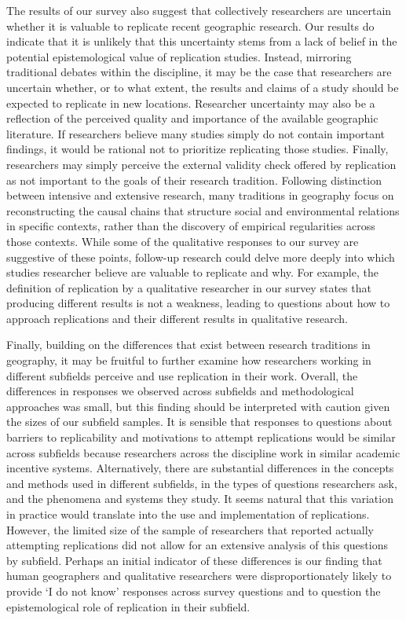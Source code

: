 \documentclass[]{interact}
\theoremstyle{plain}%
\theoremstyle{definition}
\theoremstyle{remark}
\begin{document}
The results of our survey also suggest that collectively researchers are uncertain whether it is valuable to replicate recent geographic research. 
Our results do indicate that it is unlikely that this uncertainty stems from a lack of belief in the potential epistemological value of replication studies.
Instead, mirroring traditional debates within the discipline, it may be the case that researchers are uncertain whether, or to what extent, the results and claims of a study should be expected to replicate in new locations. 
Researcher uncertainty may also be a reflection of the perceived quality and importance of the available geographic literature. 
If researchers believe many studies simply do not contain important findings, it would be rational not to prioritize replicating those studies.
Finally, researchers may simply perceive the external validity check offered by replication as not important to the goals of their research tradition. 
Following \citet{sayer1992method} distinction between intensive and extensive research, many traditions in geography focus on reconstructing the causal chains that structure social and environmental relations in specific contexts, rather than the discovery of empirical regularities across those contexts. 
While some of the qualitative responses to our survey are suggestive of these points, follow-up research could delve more deeply into which studies researcher believe are valuable to replicate and why.
For example, the definition of replication by a qualitative researcher in our survey states that producing different results is not a weakness, leading to questions about how to approach replications and their different results in qualitative research.

Finally, building on the differences that exist between research traditions in geography, it may be fruitful to further examine how researchers working in different subfields perceive and use replication in their work. 
Overall, the differences in responses we observed across subfields and methodological approaches was small, but this finding should be interpreted with caution given the sizes of our subfield samples.
It is sensible that responses to questions about barriers to replicability and motivations to attempt replications would be similar across subfields because researchers across the discipline work in similar academic incentive systems.
Alternatively, there are substantial differences in the concepts and methods used in different subfields, in the types of questions researchers ask, and the phenomena and systems they study. 
It seems natural that this variation in practice would translate into the use and implementation of replications. 
However, the limited size of the sample of researchers that reported actually attempting replications did not allow for an extensive analysis of this questions by subfield. 
Perhaps an initial indicator of these differences is our finding that human geographers and qualitative researchers were disproportionately likely to provide `I do not know' responses across survey questions and to question the epistemological role of replication in their subfield. 
\end{document}
